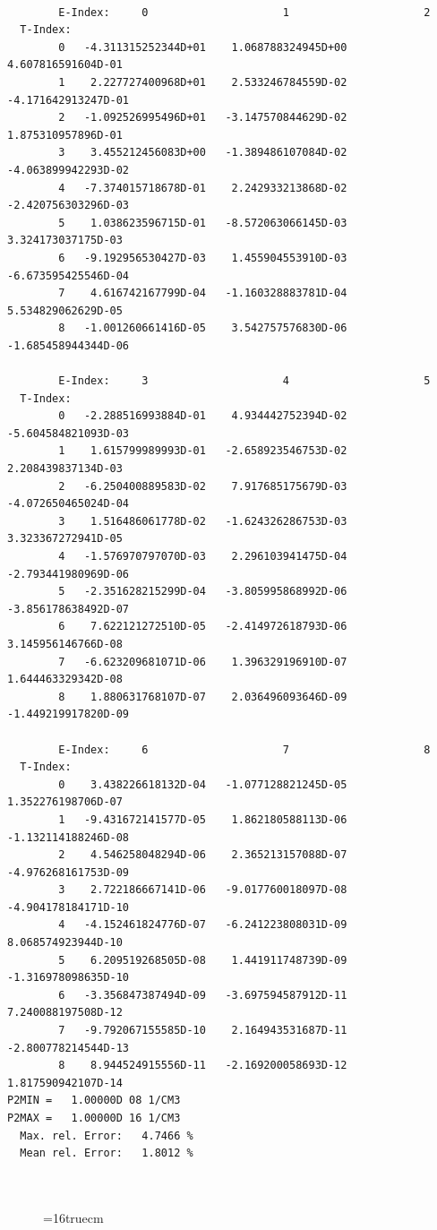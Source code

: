 \documentclass[12pt,dvipdfmx]{article}
\begin{document}
\begin{small}\begin{verbatim}

        E-Index:     0                     1                     2
  T-Index:
        0   -4.311315252344D+01    1.068788324945D+00    4.607816591604D-01
        1    2.227727400968D+01    2.533246784559D-02   -4.171642913247D-01
        2   -1.092526995496D+01   -3.147570844629D-02    1.875310957896D-01
        3    3.455212456083D+00   -1.389486107084D-02   -4.063899942293D-02
        4   -7.374015718678D-01    2.242933213868D-02   -2.420756303296D-03
        5    1.038623596715D-01   -8.572063066145D-03    3.324173037175D-03
        6   -9.192956530427D-03    1.455904553910D-03   -6.673595425546D-04
        7    4.616742167799D-04   -1.160328883781D-04    5.534829062629D-05
        8   -1.001260661416D-05    3.542757576830D-06   -1.685458944344D-06

        E-Index:     3                     4                     5
  T-Index:
        0   -2.288516993884D-01    4.934442752394D-02   -5.604584821093D-03
        1    1.615799989993D-01   -2.658923546753D-02    2.208439837134D-03
        2   -6.250400889583D-02    7.917685175679D-03   -4.072650465024D-04
        3    1.516486061778D-02   -1.624326286753D-03    3.323367272941D-05
        4   -1.576970797070D-03    2.296103941475D-04   -2.793441980969D-06
        5   -2.351628215299D-04   -3.805995868992D-06   -3.856178638492D-07
        6    7.622121272510D-05   -2.414972618793D-06    3.145956146766D-08
        7   -6.623209681071D-06    1.396329196910D-07    1.644463329342D-08
        8    1.880631768107D-07    2.036496093646D-09   -1.449219917820D-09

        E-Index:     6                     7                     8
  T-Index:
        0    3.438226618132D-04   -1.077128821245D-05    1.352276198706D-07
        1   -9.431672141577D-05    1.862180588113D-06   -1.132114188246D-08
        2    4.546258048294D-06    2.365213157088D-07   -4.976268161753D-09
        3    2.722186667141D-06   -9.017760018097D-08   -4.904178184171D-10
        4   -4.152461824776D-07   -6.241223808031D-09    8.068574923944D-10
        5    6.209519268505D-08    1.441911748739D-09   -1.316978098635D-10
        6   -3.356847387494D-09   -3.697594587912D-11    7.240088197508D-12
        7   -9.792067155585D-10    2.164943531687D-11   -2.800778214544D-13
        8    8.944524915556D-11   -2.169200058693D-12    1.817590942107D-14
P2MIN =   1.00000D 08 1/CM3
P2MAX =   1.00000D 16 1/CM3
  Max. rel. Error:   4.7466 %
  Mean rel. Error:   1.8012 %



\end{verbatim}\end{small}
\begin{figure} \label{2.2a}
\epsfxsize=16truecm
\end{figure}
\newpage
\end{document}
